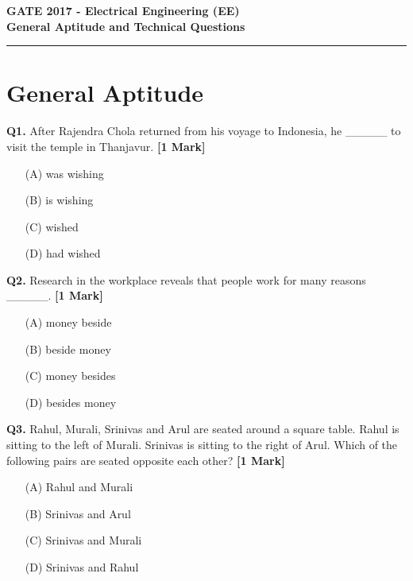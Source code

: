 \documentclass[11pt]{article}
\newcommand{\questiona}[2]{
    \noindent\textbf{Q#2.} #1 \hfill \textbf{[1 Mark]}
}
\begin{document}
\begin{center}
    \Large\textbf{GATE 2017 - Electrical Engineering (EE)} \\
    \large\textbf{General Aptitude and Technical Questions} \\
    \rule{\textwidth}{0.5pt} %
\end{center}

\vspace{0.5cm}

\section*{General Aptitude}

\questiona{After Rajendra Chola returned from his voyage to Indonesia, he \_\_\_\_\_ to visit the temple in Thanjavur.}{1}
\begin{enumerate}
    \item[(A)] was wishing  
    \item[(B)] is wishing  
    \item[(C)] wished  
    \item[(D)] had wished  
\end{enumerate}
\vspace{0.5cm}

\questiona{Research in the workplace reveals that people work for many reasons \_\_\_\_\_.}{2}
\begin{enumerate}
    \item[(A)] money beside  
    \item[(B)] beside money  
    \item[(C)] money besides  
    \item[(D)] besides money  
\end{enumerate}
\vspace{0.5cm}

\questiona{Rahul, Murali, Srinivas and Arul are seated around a square table. Rahul is sitting to the left of Murali. Srinivas is sitting to the right of Arul. Which of the following pairs are seated opposite each other?}{3}
\begin{enumerate}
    \item[(A)] Rahul and Murali  
    \item[(B)] Srinivas and Arul  
    \item[(C)] Srinivas and Murali  
    \item[(D)] Srinivas and Rahul  
\end{enumerate}
\vspace{0.5cm}
\end{document}
